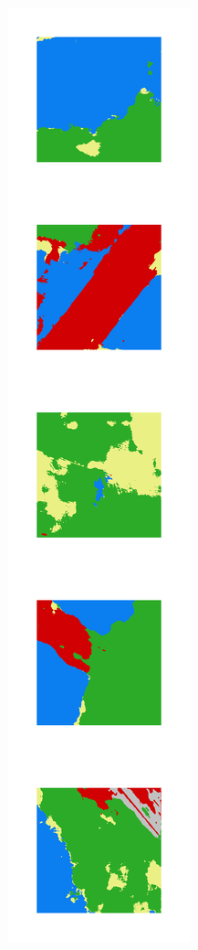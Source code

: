 \begin{figure}[h]
\begin{subfigure}{\UnetPredictionsImageWidth}
        \caption{}
        \label{fig:unet_pred_18d}
    \end{subfigure} \hspace{2mm}
    \begin{subfigure}{\UnetPredictionsImageWidth}
        \includegraphics[width=\textwidth]{images/unet/unet-23}

\end{subfigure}
\end{figure}
